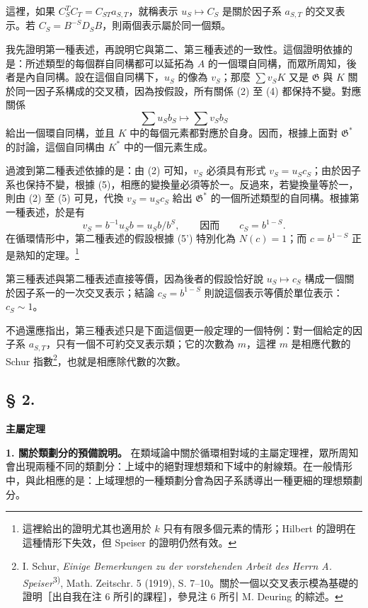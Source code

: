 \documentclass[11pt]{article}
\begin{document}
這裡，如果 \(C_S^TC_T=C_{ST}a_{S,T}\)，就稱表示 \(u_S\mapsto C_S\) 是關於因子系 \(a_{S,T}\) 的交叉表示。若 \(C_S=B^{-S}D_SB\)，則兩個表示屬於同一個類。

我先證明第一種表述，再說明它與第二、第三種表述的一致性。這個證明依據的是：所述類型的每個群自同構都可以延拓為 \(A\) 的一個環自同構，而眾所周知，後者是內自同構。設在這個自同構下，\(u_S\) 的像為 \(v_S\)；那麼 \(\sum v_SK\) 又是 \(\mathfrak G\) 與 \(K\) 關於同一因子系構成的交叉積，因為按假設，所有關係 (2) 至 (4) 都保持不變。對應關係
\[
\sum u_Sb_S\longmapsto\sum v_Sb_S
\]
給出一個環自同構，並且 \(K\) 中的每個元素都對應於自身。因而，根據上面對 \(\mathfrak G^*\) 的討論，這個自同構由 \(K^*\) 中的一個元素生成。

過渡到第二種表述依據的是：由 (2) 可知，\(v_S\) 必須具有形式 \(v_S=u_Sc_S\)；由於因子系也保持不變，根據 (5)，相應的變換量必須等於一。反過來，若變換量等於一，則由 (2) 至 (5) 可見，代換 \(v_S=u_Sc_S\) 給出 \(\mathfrak G^*\) 的一個所述類型的自同構。根據第一種表述，於是有
\[
v_S=b^{-1}u_Sb=u_Sb/b^S,
\qquad\text{因而}\qquad c_S=b^{1-S}.
\]
在循環情形中，第二種表述的假設根據 (5') 特別化為 \(N(c)=1\)；而 \(c=b^{1-S}\) 正是熟知的定理。\footnote{這裡給出的證明尤其也適用於 \(k\) 只有有限多個元素的情形；Hilbert 的證明在這種情形下失效，但 Speiser 的證明仍然有效。}

第三種表述與第二種表述直接等價，因為後者的假設恰好說 \(u_S\mapsto c_S\) 構成一個關於因子系一的一次交叉表示；結論 \(c_S=b^{1-S}\) 則說這個表示等價於單位表示：\(c_S\sim1\)。

不過還應指出，第三種表述只是下面這個更一般定理的一個特例：對一個給定的因子系 \(a_{S,T}\)，只有一個不可約交叉表示類；它的次數為 \(m\)，這裡 \(m\) 是相應代數的 Schur 指數\footnote{I. Schur, \emph{Einige Bemerkungen zu der vorstehenden Arbeit des Herrn A. Speiser}\textsuperscript{3)}, Math. Zeitschr. 5 (1919), S. 7--10。關於一個以交叉表示模為基礎的證明［出自我在注 6 所引的課程］，參見注 6 所引 M. Deuring 的綜述。}，也就是相應除代數的次數。

\subsection*{§ 2.}
\begin{center}
\textbf{主屬定理}
\end{center}

\noindent\textbf{1. 關於類劃分的預備說明。} 在類域論中關於循環相對域的主屬定理裡，眾所周知會出現兩種不同的類劃分：上域中的絕對理想類和下域中的射線類。在一般情形中，與此相應的是：上域理想的一種類劃分會為因子系誘導出一種更細的理想類劃分。
\end{document}
